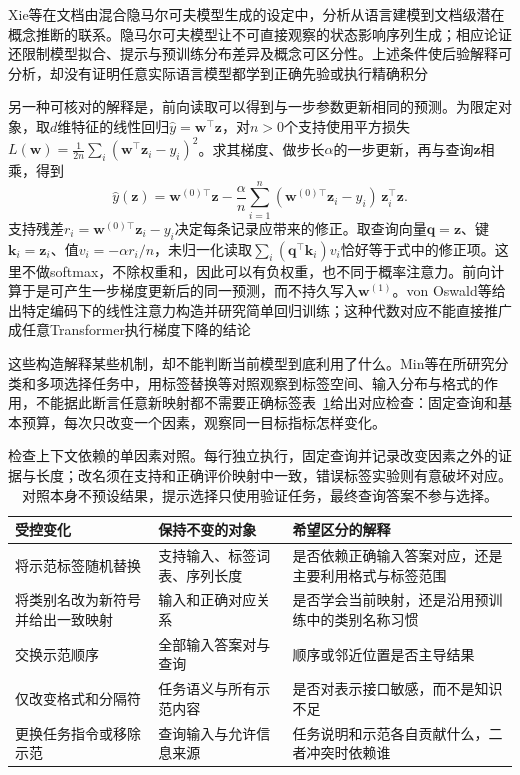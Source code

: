 Xie等在文档由混合隐马尔可夫模型生成的设定中，分析从语言建模到文档级潜在概念推断的联系。隐马尔可夫模型让不可直接观察的状态影响序列生成；相应论证还限制模型拟合、提示与预训练分布差异及概念可区分性。上述条件使后验解释可分析，却没有证明任意实际语言模型都学到正确先验或执行精确积分

另一种可核对的解释是，前向读取可以得到与一步参数更新相同的预测。为限定对象，取$d$维特征的线性回归$\hat y=\bm w^\top\bm z$，对$n>0$个支持使用平方损失$L(\bm w)=\frac1{2n}\sum_i(\bm w^\top\bm z_i-y_i)^2$。求其梯度、做步长$\alpha$的一步更新，再与查询$\bm z$相乘，得到
\begin{equation}
  \hat y(\bm z)
  =\bm w^{(0)\top}\bm z
   -\frac{\alpha}{n}\sum_{i=1}^{n}
     (\bm w^{(0)\top}\bm z_i-y_i)\,\bm z_i^\top\bm z.
  \label{eq:ket-transfer-context-gd}
\end{equation}
支持残差$r_i=\bm w^{(0)\top}\bm z_i-y_i$决定每条记录应带来的修正。取查询向量$\bm q=\bm z$、键$\bm k_i=\bm z_i$、值$v_i=-\alpha r_i/n$，未归一化读取$\sum_i(\bm q^\top\bm k_i)v_i$恰好等于式中的修正项。这里不做softmax，不除权重和，因此可以有负权重，也不同于概率注意力。前向计算于是可产生一步梯度更新后的同一预测，而不持久写入$\bm w^{(1)}$。von Oswald等给出特定编码下的线性注意力构造并研究简单回归训练；这种代数对应不能直接推广成任意Transformer执行梯度下降的结论

这些构造解释某些机制，却不能判断当前模型到底利用了什么。Min等在所研究分类和多项选择任务中，用标签替换等对照观察到标签空间、输入分布与格式的作用，不能据此断言任意新映射都不需要正确标签表~\ref{tab:ket-transfer-context-controls}给出对应检查：固定查询和基本预算，每次只改变一个因素，观察同一目标指标怎样变化。

\begin{table}[tbp]
  \centering
  \small
  \begin{tabularx}{\linewidth}{p{30mm}XX}
    \toprule
    受控变化 & 保持不变的对象 & 希望区分的解释 \\
    \midrule
    将示范标签随机替换 & 支持输入、标签词表、序列长度 & 是否依赖正确输入答案对应，还是主要利用格式与标签范围 \\
    将类别名改为新符号并给出一致映射 & 输入和正确对应关系 & 是否学会当前映射，还是沿用预训练中的类别名称习惯 \\
    交换示范顺序 & 全部输入答案对与查询 & 顺序或邻近位置是否主导结果 \\
    仅改变格式和分隔符 & 任务语义与所有示范内容 & 是否对表示接口敏感，而不是知识不足 \\
    更换任务指令或移除示范 & 查询输入与允许信息来源 & 任务说明和示范各自贡献什么，二者冲突时依赖谁 \\
    \bottomrule
  \end{tabularx}
  \caption{检查上下文依赖的单因素对照。每行独立执行，固定查询并记录改变因素之外的证据与长度；改名须在支持和正确评价映射中一致，错误标签实验则有意破坏对应。对照本身不预设结果，提示选择只使用验证任务，最终查询答案不参与选择。}
  \label{tab:ket-transfer-context-controls}
\end{table}

